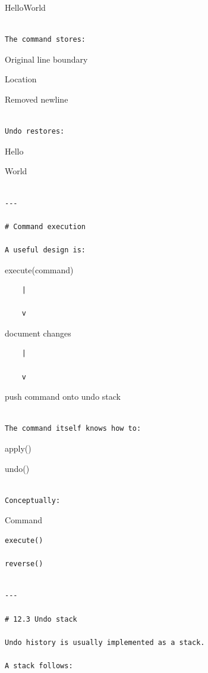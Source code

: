 \documentclass[
  oneside,
  openany]{book}
\begin{document}
HelloWorld

\begin{verbatim}

The command stores:
\end{verbatim}

Original line boundary

Location

Removed newline

\begin{verbatim}

Undo restores:
\end{verbatim}

Hello

World

\begin{verbatim}

---

# Command execution

A useful design is:
\end{verbatim}

execute(command)

\begin{verbatim}
    |

    v
\end{verbatim}

document changes

\begin{verbatim}
    |

    v
\end{verbatim}

push command onto undo stack

\begin{verbatim}

The command itself knows how to:
\end{verbatim}

apply()

undo()

\begin{verbatim}

Conceptually:
\end{verbatim}

Command

\begin{verbatim}
execute()

reverse()
\end{verbatim}

\begin{verbatim}

---

# 12.3 Undo stack

Undo history is usually implemented as a stack.

A stack follows:
\end{verbatim}
\end{document}
